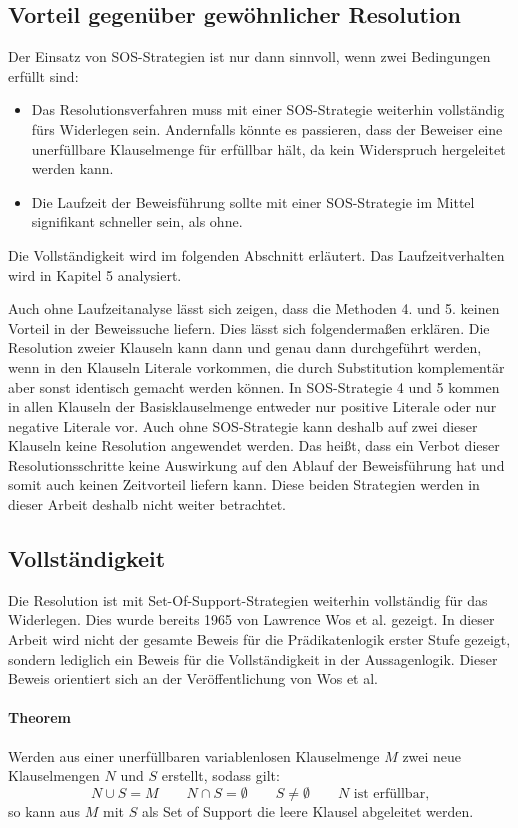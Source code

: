 \subsection{Vorteil gegenüber gewöhnlicher Resolution}
Der Einsatz von SOS-Strategien ist nur dann sinnvoll, wenn zwei Bedingungen erfüllt sind:
\begin{itemize}
	\item Das Resolutionsverfahren muss mit einer SOS-Strategie weiterhin vollständig fürs Widerlegen sein. Andernfalls könnte es passieren, dass der Beweiser eine unerfüllbare Klauselmenge für erfüllbar hält, da kein Widerspruch hergeleitet werden kann.
	\item Die Laufzeit der Beweisführung sollte mit einer SOS-Strategie im Mittel signifikant schneller sein, als ohne.

\end{itemize}
Die Vollständigkeit wird im folgenden Abschnitt erläutert. Das Laufzeitverhalten wird in Kapitel 5 analysiert.

Auch ohne Laufzeitanalyse lässt sich zeigen, dass die Methoden 4. und 5. keinen Vorteil in der Beweissuche liefern. Dies lässt sich folgendermaßen erklären. Die Resolution zweier Klauseln kann dann und genau dann durchgeführt werden, wenn in den Klauseln Literale vorkommen, die durch Substitution komplementär aber sonst identisch gemacht werden können. In SOS-Strategie 4 und 5 kommen in allen Klauseln der Basisklauselmenge entweder nur positive Literale oder nur negative Literale vor. Auch ohne SOS-Strategie kann deshalb auf zwei dieser Klauseln keine Resolution angewendet werden. Das heißt, dass ein Verbot dieser Resolutionsschritte keine Auswirkung auf den Ablauf der Beweisführung hat und somit auch keinen Zeitvorteil liefern kann. Diese beiden Strategien werden in dieser Arbeit deshalb nicht weiter betrachtet.

		\subsection{Vollständigkeit}		
Die Resolution ist mit Set-Of-Support-Strategien weiterhin vollständig für das Widerlegen. Dies wurde bereits 1965 von Lawrence Wos et al. gezeigt. In dieser Arbeit wird nicht der gesamte Beweis für die Prädikatenlogik erster Stufe gezeigt, sondern lediglich ein Beweis für die Vollständigkeit in der Aussagenlogik. Dieser Beweis orientiert sich an der Veröffentlichung von Wos et al. \cite{Wos1965Sos}

\paragraph{Theorem} Werden aus einer unerfüllbaren variablenlosen Klauselmenge $M$ zwei neue Klauselmengen $N$ und $S$ erstellt, sodass gilt: 
$$N \cup S = M \quad\quad N \cap S = \emptyset \quad\quad S \neq \emptyset \quad\quad N \text{ ist erfüllbar,}$$
so kann aus $M$ mit $S$ als Set of Support die leere Klausel abgeleitet werden.

